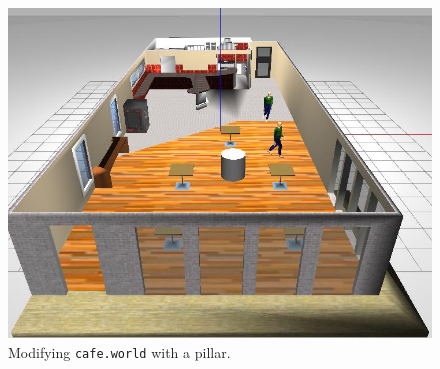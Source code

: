 \documentclass[12pt]{article}
\begin{document}
\begin{figure}[H]
  \centering\includegraphics[width=14cm]{images/mod_pillar.jpg}\vspace{-10pt}
  \caption{Modifying \texttt{cafe.world} with a pillar.}\label{fig:mod_pillar}
  \end{figure}
\end{document}
